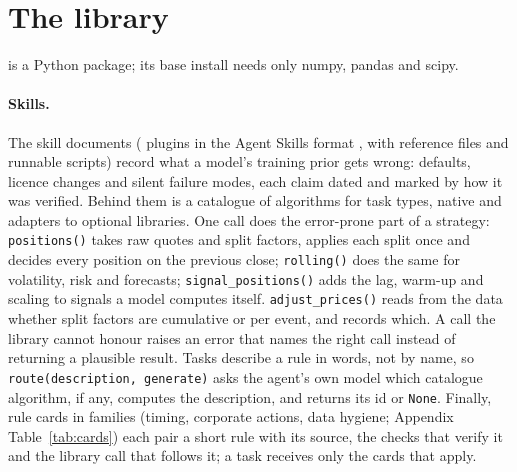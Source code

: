 \section{The \lib{} library}
\label{sec:library}

\lib{} is a Python package; its base install needs only numpy, pandas and scipy.

\paragraph{Skills.}
The \NSkills{} skill documents (\NPlugins{} plugins in the Agent Skills format
\citep{agentskills}, with \NReferenceFiles{} reference files and \NScripts{} runnable scripts)
record what a model's training prior gets wrong: defaults, licence changes and silent failure
modes, each claim dated and marked by how it was verified. Behind them is a catalogue of
\NAlgorithms{} algorithms for \NAlgorithmTasks{} task types, \NNative{} native and \NAdapters{}
adapters to \NOptionalLibraries{} optional libraries. One call does the error-prone part of a
strategy: \texttt{positions()} takes raw quotes and split factors, applies each split once and
decides every position on the previous close; \texttt{rolling()} does the same for volatility,
risk and forecasts; \texttt{signal\_positions()} adds the lag, warm-up and scaling to signals a
model computes itself. \texttt{adjust\_prices()} reads from the data whether split factors are
cumulative or per event, and records which. A call the library cannot honour raises an error
that names the right call instead of returning a plausible result. Tasks describe a rule in
words, not by name, so \texttt{route(description, generate)} asks the agent's own model which
catalogue algorithm, if any, computes the description, and returns its id or \texttt{None}.
Finally, \NCards{} rule cards in \NCardFamilies{} families (timing, corporate actions, data
hygiene; Appendix Table~\ref{tab:cards}) each pair a short rule with its source, the checks that
verify it and the library call that follows it; a task receives only the cards that apply.

